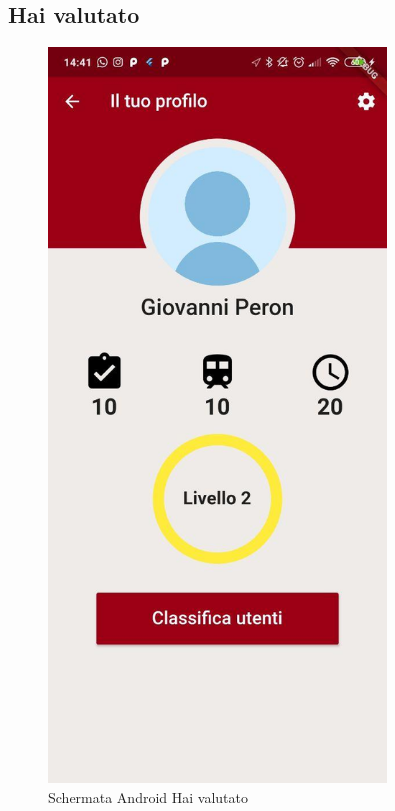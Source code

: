 \subsection{Hai valutato}
\begin{minipage}{0.45\textwidth}
	\begin{figure}[H]
		\centering
		\includegraphics[width=0.8\textwidth]{immagini/profile.jpg}
		\caption{Schermata Android Hai valutato}
	\end{figure}
\end{minipage}
\hfill

